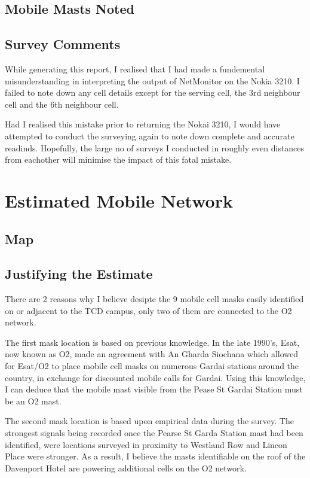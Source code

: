 \documentclass[a4paper,12pt]{article}
\begin{document}
\subsection{Mobile Masts Noted}

\subsection{Survey Comments}

While generating this report, I realised that I had made a fundemental
misunderstanding in interpreting the output of NetMonitor on the Nokia
3210. I failed to note down any cell details except for the serving
cell, the 3rd neighbour cell and the 6th neighbour cell. 


Had I realised this mistake prior to returning the Nokai 3210, I would
have attempted to conduct the surveying again to note down complete and
accurate readinds. Hopefully, the large no of surveys I conducted in 
roughly even distances from eachother will minimise the impact of this 
fatal mistake.

\section{Estimated Mobile Network}

\subsection{Map}

\subsection{Justifying the Estimate}

There are 2 reasons why I believe desipte the 9 mobile cell masks easily
identified on or adjacent to the TCD campus, only two of them are
connected to the O2 network.


The first mask location is based on previous knowledge. In the late 1990's,
Esat, now known as O2, made an agreement with An Gharda Siochana which
allowed for Esat/O2 to place mobile cell masks on numerous Gardai
stations around the country, in exchange for discounted mobile calls for
Gardai. Using this knowledge, I can deduce that the mobile mast visible
from the Pease St Gardai Station must be an O2 mast.


The second mask location is based upon empirical data during the survey.
The strongest signals being recorded once the Pearse St Garda Station
mast had been identified, were locations surveyed in proximity to
Westland Row and Lincon Place were stronger. As a result, I believe the
masts identifiable on the roof of the Davenport Hotel are powering
additional cells on the O2 network.
\end{document}
